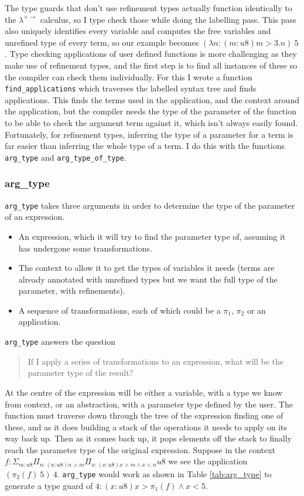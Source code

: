 The type guards that don't use refinement types actually function identically to the
$\lambda^{\times \rightarrow}$ calculus, so I type check those while doing the labelling pass.
This pass also uniquely identifies every variable and computes the free variables and unrefined
type of every term, so our example becomes $(\lambda n: (m: u8) m > 3 . n)\ 5$.
Type checking applications of user defined functions is more challenging as they make use of refinement
types, and the first step is to find all instances of these so the compiler can check them individually.
For this I wrote a function \texttt{find\_applications} which traverses the labelled syntax tree
and finds applications.
This finds the terms used in the application, and the context around the application, but the compiler
needs the type of the parameter of the function to be able to check the argument term against it,
which isn't always easily found.
Fortunately, for refinement types, inferring the type of a parameter for a term is far easier than
inferring the whole type of a term.
I do this with the functions \texttt{arg\_type} and \texttt{arg\_type\_of\_type}.

\subsubsection{arg\_type}

\texttt{arg\_type} takes three arguments in order to determine the type of the parameter of an expression.

\begin{itemize}
    \item An expression, which it will try to find the parameter type of, assuming it has undergone
    some transformations.
    \item The context to allow it to get the types of variables it needs (terms are already annotated
    with unrefined types but we want the full type of the parameter, with refinements).
    \item A sequence of transformations, each of which could be a $\pi_1$, $\pi_2$ or an application.
\end{itemize}

\texttt{arg\_type} answers the question

\begin{quote}
    If I apply a series of transformations to an expression, what will be the parameter type of the
    result?
\end{quote}

At the centre of the expression will be either a variable, with a type we know from context, or an
abstraction, with a parameter type defined by the user.
The function must traverse down through the tree of the expression finding one of these, and as it
does building a stack of the operations it needs to apply on its way back up.
Then as it comes back up, it pops elements off the stack to finally reach the parameter type of the
original expression.
Suppose in the context $f: \Sigma_{m:u8} \Pi_{n:(n:u8) n > m} \Pi_{x:(x:u8) x > m \land x < n} u8$
we see the application $(\pi_2(f)\ 5)\ 4$.
\texttt{arg\_type} would work as shown in Table \ref{tab:arg_type} to generate a type guard of
$4: (x: u8) x > \pi_1(f) \land x < 5$.


